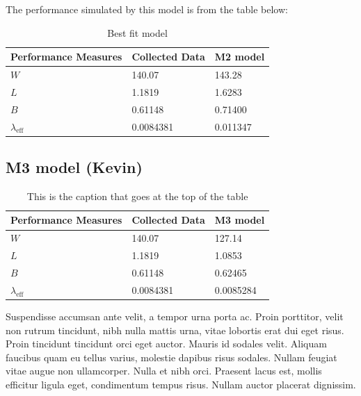 \documentclass{article}
\begin{document}
The performance simulated by this model is from the table below:

\begin{table}[H]
    \centering
    \caption{Best fit model}
    \begin{tabu}{*{3}{X[c]}}
        \toprule
        \textbf{Performance Measures} & \textbf{Collected Data} & \textbf{M2 model}\\
        \midrule
        $W$ & 140.07 & 143.28\\
        $L$ & 1.1819 & 1.6283\\
        $B$ & 0.61148 & 0.71400\\
        $\lambda_{\text{eff}}$ & 0.0084381 & 0.011347\\
        \bottomrule
    \end{tabu}
    \label{tab:M2}
\end{table}



\subsection{M3 model (Kevin)}

\begin{table}[h!]
    \centering
    \caption{This is the caption that goes at the top of the table}
    \begin{tabu}{*{3}{X[c]}}
        \toprule
        \textbf{Performance Measures} & \textbf{Collected Data} & \textbf{M3 model}\\
        \midrule
        $W$ & 140.07 & 127.14\\
        $L$ & 1.1819 & 1.0853\\
        $B$ & 0.61148 & 0.62465\\
        $\lambda_{\text{eff}}$ & 0.0084381 & 0.0085284\\
        \bottomrule
    \end{tabu}
    \label{tab:M3}
\end{table}


Suspendisse accumsan ante velit, a tempor urna porta ac. Proin porttitor, velit non rutrum tincidunt, nibh nulla mattis urna, vitae lobortis erat dui eget risus. Proin tincidunt tincidunt orci eget auctor. Mauris id sodales velit. Aliquam faucibus quam eu tellus varius, molestie dapibus risus sodales. Nullam feugiat vitae augue non ullamcorper. Nulla et nibh orci. Praesent lacus est, mollis efficitur ligula eget, condimentum tempus risus. Nullam auctor placerat dignissim.
\end{document}
